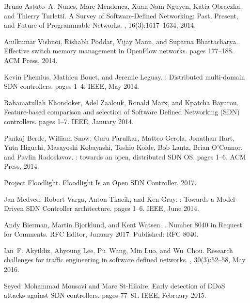 \begin{thebibliography}{100}
 Bruno Astuto~A. Nunes, Marc Mendonca, Xuan-Nam Nguyen, Katia Obraczka, and
  Thierry Turletti.
\newblock A {Survey} of {Software}-{Defined} {Networking}: {Past}, {Present},
  and {Future} of {Programmable} {Networks}.
, 16(3):1617--1634,
  2014.

 Anilkumar Vishnoi, Rishabh Poddar, Vijay Mann, and Suparna Bhattacharya.
\newblock Effective switch memory management in {OpenFlow} networks.
\newblock pages 177--188. ACM Press, 2014.

 Kevin Phemius, Mathieu Bouet, and Jeremie Leguay.
: {Distributed} multi-domain {SDN} controllers.
\newblock pages 1--4. IEEE, May 2014.

 Rahamatullah Khondoker, Adel Zaalouk, Ronald Marx, and Kpatcha Bayarou.
\newblock Feature-based comparison and selection of {Software} {Defined}
  {Networking} ({SDN}) controllers.
\newblock pages 1--7. IEEE, January 2014.

 Pankaj Berde, William Snow, Guru Parulkar, Matteo Gerola, Jonathan Hart, Yuta
  Higuchi, Masayoshi Kobayashi, Toshio Koide, Bob Lantz, Brian O'Connor, and
  Pavlin Radoslavov.
: towards an open, distributed {SDN} {OS}.
\newblock pages 1--6. ACM Press, 2014.

 {Project Floodlight}.
\newblock Floodlight {Is} an {Open} {SDN} {Controller}, 2017.

 Jan Medved, Robert Varga, Anton Tkacik, and Ken Gray.
: {Towards} a {Model}-{Driven} {SDN} {Controller}
  architecture.
\newblock pages 1--6. IEEE, June 2014.

 Andy Bierman, Martin Bjorklund, and Kent Watsen.
.
\newblock Number 8040 in Request for {Comments}. RFC Editor, January 2017.
\newblock Published: RFC 8040.

 Ian~F. Akyildiz, Ahyoung Lee, Pu~Wang, Min Luo, and Wu~Chou.
\newblock Research challenges for traffic engineering in software defined
  networks.
, 30(3):52--58, May 2016.

 Seyed~Mohammad Mousavi and Marc St-Hilaire.
\newblock Early detection of {DDoS} attacks against {SDN} controllers.
\newblock pages 77--81. IEEE, February 2015.


\end{thebibliography}

